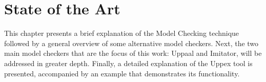 
\chapter{State of the Art}\label{ch:sota}




This chapter presents a brief explanation of the Model Checking technique followed by a general overview of some alternative model checkers. Next, the two main model checkers that are the focus of this work: Uppaal and Imitator, will be addressed in greater depth. 
Finally, a detailed explanation of the Uppex tool is presented, accompanied by an example that demonstrates its functionality.











